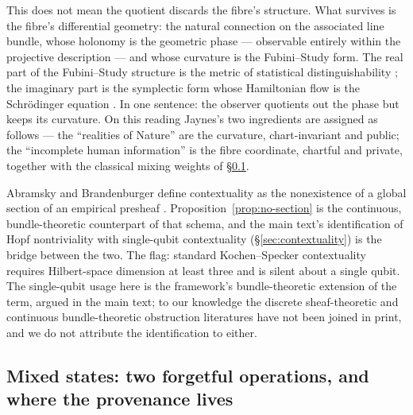 This does not mean the quotient discards the fibre's structure. What
survives is the fibre's differential geometry: the natural connection
on the associated line bundle, whose holonomy is the geometric phase
--- observable entirely within the projective description
\autocite{berry1984quantal, simon1983holonomy} --- and whose curvature
is the Fubini--Study form. The real part of the Fubini--Study
structure is the metric of statistical distinguishability
\autocite{wooters_1981}; the imaginary part is the
symplectic form whose Hamiltonian flow is the Schr\"odinger equation
\autocite{bengtsson2006geometry}. In one sentence: the observer
quotients out the phase but keeps its curvature. On this reading
Jaynes's two ingredients are assigned as follows --- the ``realities
of Nature'' are the curvature, chart-invariant and public; the
``incomplete human information'' is the fibre coordinate, chartful and
private, together with the classical mixing weights of
\S\ref{app:jaynes:mixed}.

\begin{remark}
Abramsky and Brandenburger define contextuality as the nonexistence of
a global section of an empirical presheaf \autocite{abramsky2011sheaf}.
Proposition~\ref{prop:no-section} is the continuous, bundle-theoretic
counterpart of that schema, and the main text's identification of Hopf
nontriviality with single-qubit contextuality
(\S\ref{sec:contextuality}) is the bridge between the two. The flag:
standard Kochen--Specker contextuality requires Hilbert-space
dimension at least three and is silent about a single qubit. The
single-qubit usage here is the framework's bundle-theoretic extension
of the term, argued in the main text; to our knowledge the discrete
sheaf-theoretic and continuous bundle-theoretic obstruction
literatures have not been joined in print, and we do not attribute the
identification to either.
\end{remark}

\subsection{Mixed states: two forgetful operations, and where the
  provenance lives}
\label{app:jaynes:mixed}

